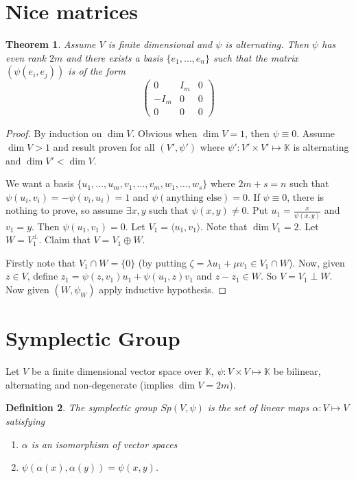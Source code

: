 \documentclass{notes}
\theoremstyle{plain}
\newtheorem{theorem}{Theorem}[chapter]
\newtheorem{definition}[theorem]{Definition}
\begin{document}
\section{Nice matrices}

\begin{theorem}
  Assume $V$ is finite dimensional and $\psi$ is alternating.  Then
  $\psi$ has even rank $2m$ and there exists a basis $\{e_1, \dots
  ,e_n \}$ such that the matrix $(\psi(e_i,e_j))$ is of the form
\[
\left(
\begin{matrix}
  0       & I_m   & 0 \\
  -I_m    & 0     & 0 \\
  0 & 0 & 0
\end{matrix}
\right)
\]
\end{theorem}

\begin{proof}
  By induction on $\dim V$.  Obvious when $\dim V = 1$, then $\psi
  \equiv 0$.  Assume $\dim V > 1$ and result proven for all
  $(V',\psi')$ where $\psi' : V' \times V' \mapsto \mathbb{K}$ is
  alternating and $\dim V' < \dim V$.
  
  We want a basis $\{u_1,\dots, u_m, v_1, \dots, v_m, w_1, \dots ,
  w_s\}$ where $2m+s = n$ such that $\psi(u_i,v_i)=-\psi(v_i,u_i)=1$
  and $\psi(\text{anything else}) = 0$.  If $\psi \equiv 0$, there is
  nothing to prove, so assume $\exists x,y$ such that $\psi(x,y) \ne
  0$.  Put $u_1 = \frac{x}{\psi(x,y)}$ and $v_1 = y$.  Then
  $\psi(u_1,v_1)=0$.  Let $V_1 = \langle u_1,v_1 \rangle$.  Note that
  $\dim V_1 = 2$.  Let $W=V_1^{\perp}$.  Claim that $V = V_1 \oplus
  W$.
  
  Firstly note that $V_1 \cap W = \{0\}$ (by putting $\zeta = \lambda
  u_1 + \mu v_1 \in V_1 \cap W$).  Now, given $z \in V$, define $z_1 =
  \psi(z,v_1)u_1 + \psi(u_1,z)v_1$ and $z-z_1 \in W$.  So $V = V_1
  \perp W$.  Now given $(W,\psi_W)$ apply inductive hypothesis.
\end{proof}

\section{Symplectic Group}

Let $V$ be a finite dimensional vector space over $\mathbb{K}$, $\psi
: V \times V \mapsto \mathbb{K}$ be bilinear, alternating and
non-degenerate (implies $\dim V = 2m$).

\begin{definition}
  The symplectic group $Sp(V,\psi)$ is the set of linear maps $\alpha
  : V \mapsto V$ satisfying
\begin{enumerate}
\item $\alpha$ is an isomorphism of vector spaces
\item $\psi(\alpha(x),\alpha(y)) = \psi(x,y)$.
\end{enumerate}
\end{definition}
\end{document}
